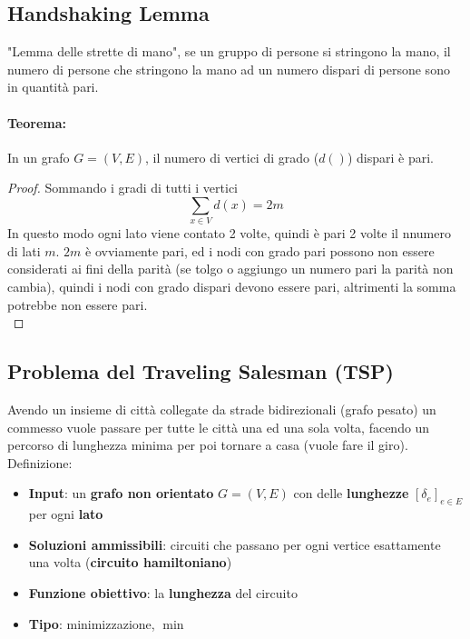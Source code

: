 \newpage

\subsection*{Handshaking Lemma}
"Lemma delle strette di mano", se un gruppo di persone si stringono la mano, il numero di persone che stringono la mano ad un numero dispari di persone sono in quantità pari.\\

\paragraph{Teorema:} In un grafo $G=(V,E)$, il numero di vertici di grado ($d()$) dispari è pari.\\

\begin{proof}
	Sommando i gradi di tutti i vertici
	$$ \sum_{x \in V} d(x) = 2m $$
	In questo modo ogni lato viene contato 2 volte, quindi è pari 2 volte il nnumero di lati $m$. $2m$ è ovviamente pari, ed i nodi con grado pari possono non essere considerati ai fini della parità (se tolgo o aggiungo un numero pari la parità non cambia), quindi i nodi con grado dispari devono essere pari, altrimenti la somma potrebbe non essere pari.\\
\end{proof}


\newpage

\subsection{Problema del Traveling Salesman (TSP)}
Avendo un insieme di città collegate da strade bidirezionali (grafo pesato) un commesso vuole passare per tutte le città una ed una sola volta, facendo un percorso di lunghezza minima per poi tornare a casa (vuole fare il giro).\\

Definizione: 
\begin{itemize}
	\item \textbf{Input}: un \textbf{grafo non orientato} $G = (V,E)$ con delle \textbf{lunghezze} $[\delta_e]_{e \in E}$ per ogni \textbf{lato}
	
	\item \textbf{Soluzioni ammissibili}: circuiti che passano per ogni vertice esattamente una volta (\textbf{circuito hamiltoniano})
	
	\item \textbf{Funzione obiettivo}: la \textbf{lunghezza} del circuito
	
	\item \textbf{Tipo}: minimizzazione, $\min$
\end{itemize}


